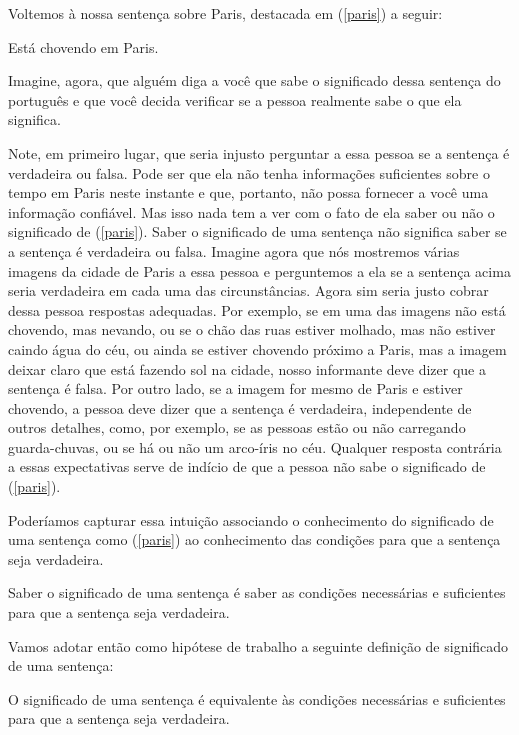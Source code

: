 Voltemos à nossa sentença sobre Paris, destacada em (\ref{paris}) a seguir:

\begin{exe}
	\ex Está chovendo em Paris.\label{paris}
\end{exe}


\n Imagine, agora, que alguém diga a você que sabe o significado dessa sentença do português e que você decida verificar se a pessoa realmente sabe o
que ela significa.


Note, em primeiro lugar, que seria injusto perguntar a
essa pessoa se a sentença é verdadeira ou falsa. Pode ser que ela
não tenha informa\-çõ\-es suficientes sobre o tempo em Paris neste
instante e que, portanto, não possa fornecer a você uma
informa\-ção confiável. Mas isso nada tem a ver com o fato de ela
saber ou não o significado de (\ref{paris}). Saber o significado
de uma sentença não significa saber se a sentença é verdadeira ou
falsa. Imagine agora que nós mostremos várias imagens da cidade de
Paris a essa pessoa e perguntemos a ela se a sentença acima seria
verdadeira em cada uma das circunstâncias. Agora sim seria justo
cobrar dessa pessoa respostas adequadas. Por exemplo, se em uma
das imagens não está chovendo, mas nevando, ou se o chão das ruas
estiver molhado, mas não estiver caindo água do céu, ou ainda se
estiver chovendo próximo a Paris, mas a imagem deixar claro que
está fazendo sol na cidade, nosso informante deve dizer que a
sentença é falsa. Por outro lado, se a imagem for mesmo de Paris e
estiver chovendo, a pessoa deve dizer que a sentença é verdadeira,
independente de outros detalhes, como, por exemplo, se as pessoas
estão ou não carregando guarda-chuvas, ou se há ou não um
arco-íris no céu. Qualquer resposta contrária a essas expectativas
serve de indício de que a pessoa não sabe o significado de
(\ref{paris}).

Poderíamos capturar essa intuição associando o conhecimento do
significado de uma sentença como (\ref{paris}) ao conhecimento das
condi\-çõ\-es para que a sentença seja
verdadeira.

\begin{exe}
	\ex Saber o significado de uma sentença é saber as condi\-çõ\-es necessárias e suficientes para que a sentença seja verdadeira.
\end{exe}

Vamos adotar então como hipótese de trabalho a seguinte
defini\-ção de significado de uma sentença:

\begin{exe}
	\ex O significado de uma sentença é equivalente às condi\-çõ\-es necessárias e suficientes para que a sentença seja verdadeira.
\end{exe}

